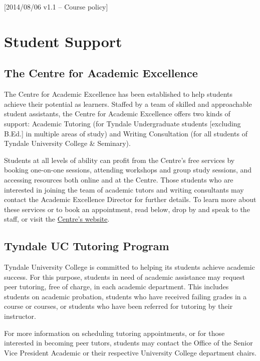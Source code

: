 [2014/08/06 v1.1 -- Course policy]

\section{Student Support}
\label{support}

\subsection{The Centre for Academic Excellence}
\label{centre}

The Centre for Academic Excellence has been established to help students
achieve their potential as learners. Staffed by a team of skilled and
approachable student assistants, the Centre for Academic Excellence
offers two kinds of support: Academic Tutoring (for Tyndale
Undergraduate students [excluding B.Ed.] in multiple areas of study) and
Writing Consultation (for all students of Tyndale University College \&
Seminary).

Students at all levels of ability can profit from the Centre’s free
services by booking one-on-one sessions, attending workshops and group
study sessions, and accessing resources both online and at the Centre.
Those students who are interested in joining the team of academic tutors
and writing consultants may contact the Academic Excellence Director for
further details. To learn more about these services or to book an
appointment, read below, drop by and speak to the staff, or visit the
\href{http://www.tyndale.ca/academic-excellence}{Centre's website}.

\subsection{Tyndale UC Tutoring Program}
\label{tutoring}

Tyndale University College is committed to helping its students achieve academic
success. For this purpose, students in need of academic assistance may request
peer tutoring, free of charge, in each academic department. This includes
students on academic probation, students who have received failing grades in a
course or courses, or students who have been referred for tutoring by their
instructor.

For more information on scheduling tutoring appointments, or for those
interested in becoming peer tutors, students may contact the Office of the
Senior Vice President Academic or their respective University College department
chairs.


